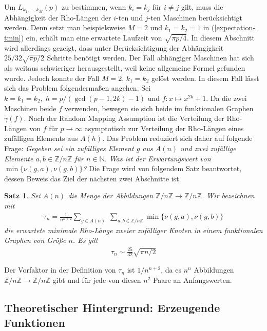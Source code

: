 \documentclass[a4paper, 11pt, ngerman]{article}
\newcommand{\N}{\mathbb{N}}
\newcommand{\Z}{\mathbb{Z}}
\newtheorem{theorem}{Satz}
\begin{document}
Um $L_{k_1, \dots, k_M}(p)$ zu bestimmen, wenn $k_i = k_j$ für $i \ne j$ gilt, muss die Abhängigkeit der Rho-Längen der $i$-ten und $j$-ten Maschinen berücksichtigt werden. Denn setzt man beispielsweise $M = 2$ und $k_1 = k_2 = 1$ in (\ref{expectation-tmin}) ein, erhält man eine erwartete Laufzeit von $\sqrt {\pi p / 4}$. In diesem Abschnitt wird allerdings gezeigt, dass unter Berücksichtigung der Abhängigkeit $25/32 \sqrt{\pi p / 2}$ Schritte benötigt werden. Der Fall abhängiger Maschinen hat sich als weitaus schwieriger herausgestellt, weil keine allgemeine Formel gefunden wurde. Jedoch konnte der Fall $M = 2, \, k_1 = k_2$ gelöst werden. In diesem Fall lässt sich das Problem folgendermaßen angehen. Sei $k = k_1 = k_2, \; h = p/(\gcd(p - 1, 2k) - 1)$ und $f : x \mapsto x^{2k} + 1$. Da die zwei Maschinen beide $f$ verwenden, bewegen sie sich beide im funktionalen Graphen $\gamma(f)$. Nach der Random Mapping Assumption ist die Verteilung der Rho-Längen von $f$ für $p \to \infty$ asymptotisch zur Verteilung der Rho-Längen eines zufälligen Elements aus $A(h)$. Das Problem reduziert sich daher auf folgende Frage: \emph{Gegeben sei ein zufälliges Element $g$ aus $A(n)$ und zwei zufällige Elemente $a, b \in \Z/n\Z$ für $n \in \N$. Was ist der Erwartungswert von $\min\{\nu(g, a), \nu(g, b)\}$?} Die Frage wird von folgendem Satz beantwortet, dessen Beweis das Ziel der nächsten zwei Abschnitte ist.

\begin{theorem}
    \label{theorem:min-rho-len-m2}
    Sei $A(n)$ die Menge der Abbildungen $\Z/n\Z \to \Z/n\Z$. Wir bezeichnen mit
    \begin{align*}
        \tau_n =  \frac 1 {n^{n + 2}}
        \sum_{g \in A(n)} \; \sum_{a, b \in \Z/n\Z}
        \min\{\nu(g, a), \nu(g, b)\}
    \end{align*}
    die erwartete minimale Rho-Länge zweier zufälliger Knoten in einem funktionalen Graphen von Größe $n$. Es gilt
    \begin{align*}
        \tau_n \sim \frac {25} {32} \sqrt{\pi n / 2}
    \end{align*}
\end{theorem}

\noindent Der Vorfaktor in der Definition von $\tau_n$ ist $1/n^{n + 2}$, da es $n^n$ Abbildungen $\Z/n\Z \to \Z/n\Z$ gibt und für jede von diesen $n^2$ Paare an Anfangswerten.

\subsection{Theoretischer Hintergrund: Erzeugende Funktionen}
\end{document}
